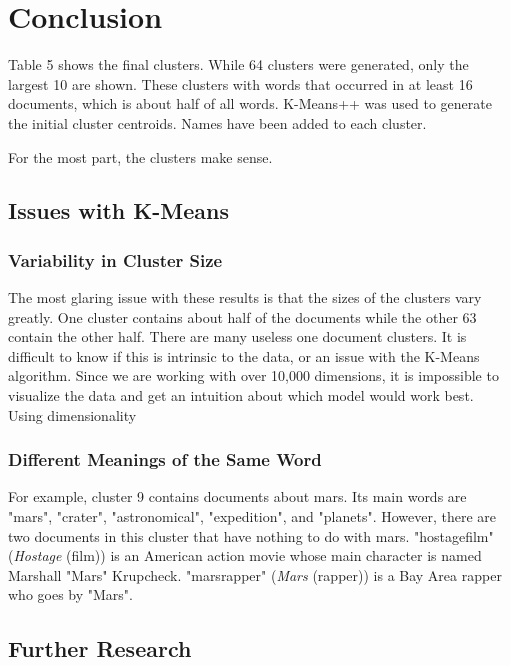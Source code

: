 \documentclass{article} %
\begin{document}
\section{Conclusion}

Table 5 shows the final clusters. While 64 clusters were generated, only the largest 10 are shown. These clusters with words that occurred in at least 16 documents, which is about half of all words. K-Means++ was used to generate the initial cluster centroids. Names have been added to each cluster.
 
For the most part, the clusters make sense. 

\subsection{Issues with K-Means}

\subsubsection{Variability in Cluster Size}

The most glaring issue with these results is that the sizes of the clusters vary greatly. One cluster contains about half of the documents while the other 63 contain the other half. There are many useless one document clusters. It is difficult to know if this is intrinsic to the data, or an issue with the K-Means algorithm. Since we are working with over 10,000 dimensions, it is impossible to visualize the data and get an intuition about which model would work best. Using dimensionality  

\subsubsection{Different Meanings of the Same Word}

For example, cluster 9 contains documents about mars. Its main words are "mars", "crater", "astronomical", "expedition", and "planets". However, there are two documents in this cluster that have nothing to do with mars. "hostagefilm" (\textit{Hostage} (film)) is an American action movie whose main character is named Marshall "Mars" Krupcheck. "marsrapper" (\textit{Mars} (rapper)) is a Bay Area rapper who goes by "Mars". 


\subsection{Further Research}
\end{document}
